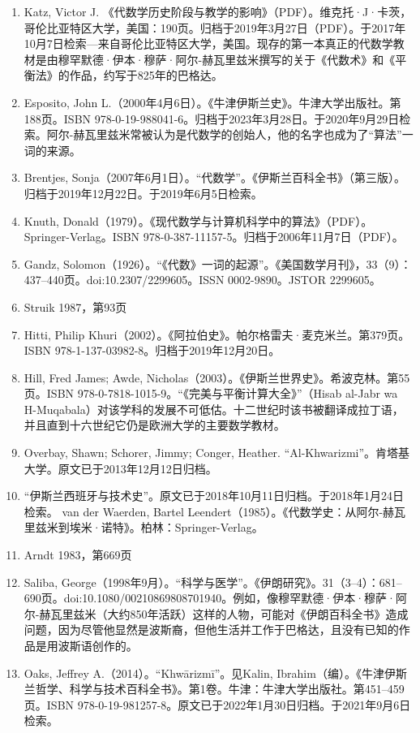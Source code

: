 \begin{enumerate}
\item Katz, Victor J. 《代数学历史阶段与教学的影响》（PDF）。维克托·J·卡茨，哥伦比亚特区大学，美国：190页。归档于2019年3月27日（PDF）。于2017年10月7日检索—来自哥伦比亚特区大学，美国。现存的第一本真正的代数学教材是由穆罕默德·伊本·穆萨·阿尔-赫瓦里兹米撰写的关于《代数术》和《平衡法》的作品，约写于825年的巴格达。  
\item Esposito, John L.（2000年4月6日）。《牛津伊斯兰史》。牛津大学出版社。第188页。ISBN 978-0-19-988041-6。归档于2023年3月28日。于2020年9月29日检索。阿尔-赫瓦里兹米常被认为是代数学的创始人，他的名字也成为了“算法”一词的来源。  
\item Brentjes, Sonja（2007年6月1日）。“代数学”。《伊斯兰百科全书》（第三版）。归档于2019年12月22日。于2019年6月5日检索。  
\item Knuth, Donald（1979）。《现代数学与计算机科学中的算法》（PDF）。Springer-Verlag。ISBN 978-0-387-11157-5。归档于2006年11月7日（PDF）。  
\item Gandz, Solomon（1926）。“《代数》一词的起源”。《美国数学月刊》，33（9）：437–440页。doi:10.2307/2299605。ISSN 0002-9890。JSTOR 2299605。  
\item Struik 1987，第93页  
\item Hitti, Philip Khuri（2002）。《阿拉伯史》。帕尔格雷夫·麦克米兰。第379页。ISBN 978-1-137-03982-8。归档于2019年12月20日。  
\item Hill, Fred James; Awde, Nicholas（2003）。《伊斯兰世界史》。希波克林。第55页。ISBN 978-0-7818-1015-9。“《完美与平衡计算大全》”（Hisab al-Jabr wa H-Muqabala）对该学科的发展不可低估。十二世纪时该书被翻译成拉丁语，并且直到十六世纪它仍是欧洲大学的主要数学教材。
\item Overbay, Shawn; Schorer, Jimmy; Conger, Heather. “Al-Khwarizmi”。肯塔基大学。原文已于2013年12月12日归档。  
\item “伊斯兰西班牙与技术史”。原文已于2018年10月11日归档。于2018年1月24日检索。  
van der Waerden, Bartel Leendert（1985）。《代数学史：从阿尔-赫瓦里兹米到埃米·诺特》。柏林：Springer-Verlag。  
\item Arndt 1983，第669页  
\item Saliba, George（1998年9月）。“科学与医学”。《伊朗研究》。31（3–4）：681–690页。doi:10.1080/00210869808701940。例如，像穆罕默德·伊本·穆萨·阿尔-赫瓦里兹米（大约850年活跃）这样的人物，可能对《伊朗百科全书》造成问题，因为尽管他显然是波斯裔，但他生活并工作于巴格达，且没有已知的作品是用波斯语创作的。  
\item Oaks, Jeffrey A.（2014）。“Khwārizmī”。见Kalin, Ibrahim（编）。《牛津伊斯兰哲学、科学与技术百科全书》。第1卷。牛津：牛津大学出版社。第451–459页。ISBN 978-0-19-981257-8。原文已于2022年1月30日归档。于2021年9月6日检索。  

\end{enumerate}
